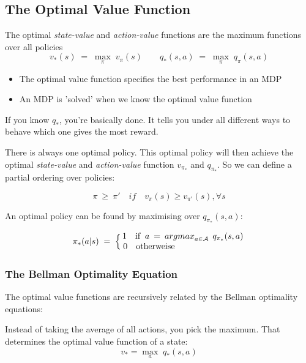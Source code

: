 \documentclass[10pt]{article}
\begin{document}
\subsection{The Optimal Value Function}
The optimal \textit{state-value} and \textit{action-value} functions are the maximum functions over all policies
\begin{equation}
v_{*}(s)\;=\;\mathop{max}_{\pi} \; v_{\pi}(s) \qquad q_{*}(s,a)\;=\;\mathop{max}_{\pi} \; q_{\pi}(s, a)
\end{equation}

\begin{itemize}
\item The optimal value function specifies the best performance in an MDP
\item An MDP is 'solved' when we know the optimal value function
\end{itemize}

If you know $q_{*}$, you're basically done. It tells you under all different ways to behave which one gives the most reward.

There is always one optimal policy. This optimal policy will then achieve the optimal \textit{state-value} and \textit{action-value} function $v_{\pi_{*}}$ and $q_{\pi_{*}}$. So we can define a partial ordering over policies:

\begin{equation}
\pi \: \geq \: \pi ' \quad if \quad v_{\pi}(s) \geq v_{\pi'}(s), \forall s
\end{equation}

An optimal policy can be found by maximising over $q_{\pi_{*}}(s,a)$:

\begin{equation}
\pi_{*}(a|s)\;=\; \Big\{ \begin{matrix} 
 1 \quad $if$ \;\; a \: = \: \mathop{argmax}_{a \in \mathcal{A}} \; q_{\pi_{*}}(s,a) \\
\; 0 \quad $otherweise$ \hphantom{abcdedgwfdwfdgh}
\end{matrix}
\end{equation}

\subsubsection*{The Bellman Optimality Equation}

The optimal value functions are recursively related by the Bellman optimality equations:

Instead of taking the average of all actions, you pick the maximum. That determines the optimal value function of a state:
\begin{equation}
v_{*} = \mathop{max}_{a} \; q_{*}(s, a)
\end{equation}
\end{document}
